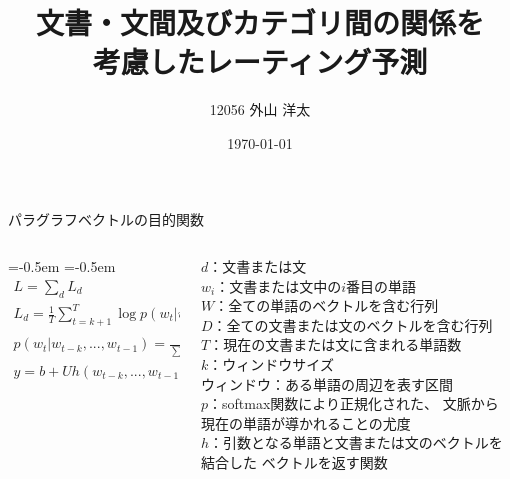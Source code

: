 \documentclass[aspectratio=43,unicode,10pt]{beamer}
\title{文書・文間及びカテゴリ間の関係を\\考慮したレーティング予測}
\institute{知能数理研究室}
\author{12056 外山 洋太}
\date{\today}
\newlength{\mycolumnwidth}
\begin{document}
\begin{frame}{パラグラフベクトルの目的関数}{}
  \begin{columns}
    \begin{column}{\mycolumnwidth}
      \abovedisplayskip=-0.5em %
      \belowdisplayskip=-0.5em %
      \begin{gather*}
        L = \sum_d L_d \\
        L_d = \frac{1}{T} \sum^{T}_{t = k + 1}
              \log p(w_t | w_{t-k}, ..., w_{t-1}), \\
        p(w_t | w_{t-k}, ..., w_{t-1})
            = \frac{e^{y_{w_t}}}{\sum_{w'} e^{y_{w'}}}, \\
        y = b + Uh(w_{t-k}, ..., w_{t-1}, d; W, D)
      \end{gather*}
    \end{column}
    \begin{column}{\mycolumnwidth}
      \footnotesize
      $d$：文書または文 \\
      $w_i$：文書または文中の$i$番目の単語 \\
      $W$：全ての単語のベクトルを含む行列 \\
      $D$：全ての文書または文のベクトルを含む行列 \\
      $T$：現在の文書または文に含まれる単語数 \\
      $k$：ウィンドウサイズ \\
      ウィンドウ：ある単語の周辺を表す区間 \\
      $p$：softmax関数により正規化された、
           文脈から現在の単語が導かれることの尤度 \\
      $h$：引数となる単語と文書または文のベクトルを結合した
           ベクトルを返す関数 \\
    \end{column}
  \end{columns}
\end{frame}
\end{document}
